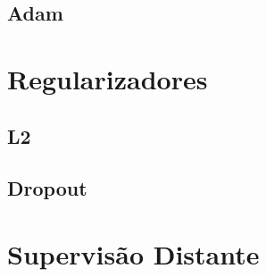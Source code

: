 \subsection{Adam}

\section{Regularizadores} \label{sec:regularizadores}

\subsection{L2}

\subsection{Dropout}

\section{Supervisão Distante}
